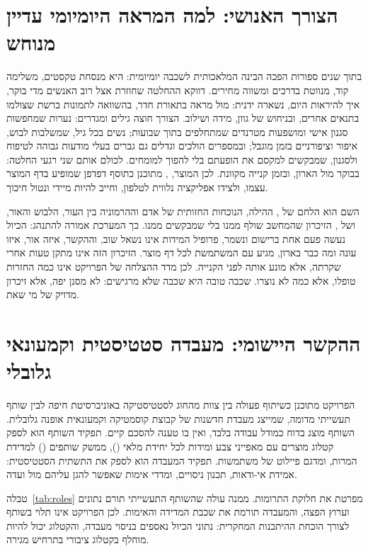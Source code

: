 \section{הצורך האנושי: למה המראה היומיומי עדיין מנוחש}
\label{sec:human}

בתוך שנים ספורות הפכה הבינה המלאכותית לשכבה יומיומית: היא מנסחת טקסטים, משלימה קוד, מנווטת בדרכים ומשווה מחירים. דווקא ההחלטה שחוזרת אצל רוב האנשים מדי בוקר, איך להיראות היום, נשארה ידנית: מול מראה בתאורת חדר, בהשוואה לתמונות ברשת שצולמו בתנאים אחרים, ובניחוש של גוון, מידה ושילוב. הצורך חוצה גילים ומגדרים: נערות שמחפשות סגנון אישי ומושפעות מטרנדים שמתחלפים בתוך שבועות; נשים בכל גיל, שמשלבות לבוש, איפור וציפורניים בזמן מוגבל; ובמספרים הולכים וגדלים גם גברים בעלי מודעות גבוהה לטיפוח ולסגנון, שמבקשים למקסם את הופעתם בלי להפוך למומחים. לכולם אותם שני רגעי החלטה: בבוקר מול הארון, ובזמן קנייה מקוונת. לכן המוצר, , מתוכנן כתוסף דפדפן שמופיע בדף המוצר עצמו, ולצידו אפליקציה נלווית לטלפון, וחייב להיות מיידי ונטול חיכוך.

\begin{examplebox}
השם הוא הלחם של , ההילה, הנוכחות החזותית של אדם וההרמוניה בין העור, הלבוש והאור, ושל , הזיכרון שהמחשב שולף ממנו בלי שמבקשים ממנו. כך המערכת אמורה להתנהג: הכיול נעשה פעם אחת ברישום ונשמר, פרופיל המידות אינו נשאל שוב, וההקשר, איזה אור, איזו עונה ומה כבר בארון, מגיע עם המשתמשת לכל דף מוצר. הזיכרון הזה אינו מתקן טעות אחרי שקרתה, אלא מונע אותה לפני הקנייה. לכן מדד ההצלחה של הפרויקט אינו כמה החזרות טופלו, אלא כמה לא נוצרו. שכבה טובה היא שכבה שלא מרגישים: לא מסנן יפה, אלא זיכרון מדויק של מי שאת.
\end{examplebox}

\section{ההקשר היישומי: מעבדה סטטיסטית וקמעונאי גלובלי}
\label{sec:context}

הפרויקט מתוכנן כשיתוף פעולה בין צוות מהחוג לסטטיסטיקה באוניברסיטת חיפה לבין שותף תעשייתי מדומה, שמייצג מעבדת חדשנות של קבוצת קוסמטיקה וקמעונאית אופנה גלובלית. השותף מוצג בדוח כמודל עבודה בלבד, ואין בו טענה להסכם קיים. תפקיד השותף הוא לספק קטלוג מוצרים עם מאפייני צבע ומידות לכל יחידת מלאי (), ממשק שותפים () למדידת המרות, ומדגם פיילוט של משתמשות. תפקיד המעבדה הוא לספק את התשתית הסטטיסטית: אמידת אי-ודאות, תכנון ניסויים, ומדדי אימות שאפשר להגן עליהם מול ועדה.

טבלה~\ref{tab:roles} מפרטת את חלוקת התרומות. ממנה עולה שהשותף התעשייתי תורם נתונים וערוץ הפצה, והמעבדה תורמת את שכבת המדידה והאימות. לכן הפרויקט אינו תלוי בשותף לצורך הוכחת ההיתכנות המחקרית: נתוני הכיול נאספים בניסוי מעבדה, והקטלוג יכול להיות מוחלף בקטלוג ציבורי בתרחיש מגירה.

